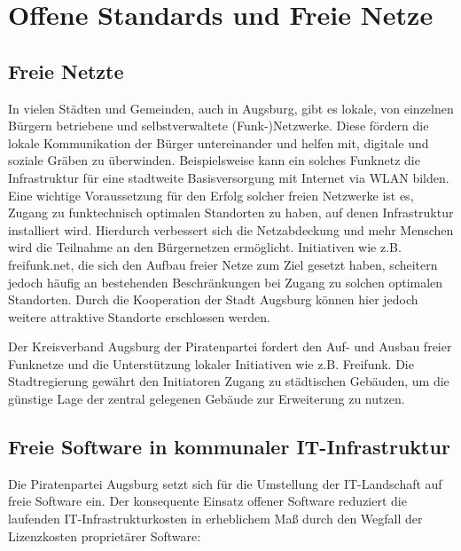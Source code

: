 \chapter{Offene Standards und Freie Netze}
  
  \section{Freie Netzte}
  
  In vielen Städten und Gemeinden, auch in Augsburg, gibt es lokale, von 
  einzelnen Bürgern betriebene und selbstverwaltete (Funk-)Netzwerke. Diese 
  fördern die lokale Kommunikation der Bürger untereinander und helfen mit, 
  digitale und soziale Gräben zu überwinden. Beispielsweise kann ein solches 
  Funknetz die Infrastruktur für eine stadtweite Basisversorgung mit Internet 
  via WLAN bilden. Eine wichtige Voraussetzung für den Erfolg solcher freien 
  Netzwerke ist es, Zugang zu funktechnisch optimalen Standorten zu haben, auf 
  denen Infrastruktur installiert wird. Hierdurch verbessert sich die 
  Netzabdeckung und mehr Menschen wird die Teilnahme an den Bürgernetzen 
  ermöglicht. Initiativen wie z.B. freifunk.net, die sich den Aufbau freier 
  Netze zum Ziel gesetzt haben, scheitern jedoch häufig an bestehenden 
  Beschränkungen bei Zugang zu solchen optimalen Standorten. Durch die 
  Kooperation der Stadt Augsburg können hier jedoch weitere attraktive 
  Standorte erschlossen werden.
  
  Der Kreisverband Augsburg der Piratenpartei fordert den Auf- und Ausbau 
  freier Funknetze und die Unterstützung lokaler Initiativen wie z.B. 
  Freifunk. Die Stadtregierung gewährt den Initiatoren Zugang zu 
  städtischen Gebäuden, um die günstige Lage der zentral gelegenen Gebäude zur 
  Erweiterung zu nutzen. 
  
  \section{Freie Software in kommunaler IT-Infrastruktur}
  \label{sec:Freie Software in kommunaler IT-Infrastruktur}
  
  Die Piratenpartei Augsburg setzt sich für die Umstellung der IT-Landschaft 
  auf freie Software ein. Der konsequente Einsatz offener Software reduziert 
  die laufenden IT-Infrastrukturkosten in erheblichem Maß durch den Wegfall 
  der Lizenzkosten proprietärer Software:
  
